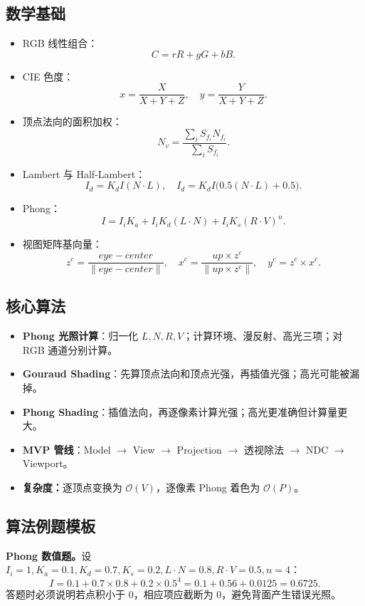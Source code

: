 \documentclass[UTF8,zihao=-4,scheme=chinese,fontset=fandol]{ctexart}
\newcommand{\key}[1]{\textbf{#1}}
\newcommand{\complexity}[1]{\textbf{复杂度：}#1}
\begin{document}
\subsection{数学基础}
\begin{itemize}
  \item RGB 线性组合：
  \[
  C=rR+gG+bB.
  \]
  \item CIE 色度：
  \[
  x=\frac{X}{X+Y+Z},\quad y=\frac{Y}{X+Y+Z}.
  \]
  \item 顶点法向的面积加权：
  \[
  N_v=\frac{\sum_i S_{f_i}N_{f_i}}{\sum_iS_{f_i}}.
  \]
  \item Lambert 与 Half-Lambert：
  \[
  I_d=K_dI(N\cdot L),\quad I_d=K_dI\bigl(0.5(N\cdot L)+0.5\bigr).
  \]
  \item Phong：
  \[
  I=I_iK_a+I_iK_d(L\cdot N)+I_iK_s(R\cdot V)^n.
  \]
  \item 视图矩阵基向量：
  \[
  z^c=\frac{eye-center}{\|eye-center\|},\quad
  x^c=\frac{up\times z^c}{\|up\times z^c\|},\quad
  y^c=z^c\times x^c.
  \]
\end{itemize}

\subsection{核心算法}
\begin{itemize}
  \item \key{Phong 光照计算}：归一化 $L,N,R,V$；计算环境、漫反射、高光三项；对 RGB 通道分别计算。
  \item \key{Gouraud Shading}：先算顶点法向和顶点光强，再插值光强；高光可能被漏掉。
  \item \key{Phong Shading}：插值法向，再逐像素计算光强；高光更准确但计算量更大。
  \item \key{MVP 管线}：Model $\rightarrow$ View $\rightarrow$ Projection $\rightarrow$ 透视除法 $\rightarrow$ NDC $\rightarrow$ Viewport。
  \item \complexity{逐顶点变换为 $\mathcal O(V)$，逐像素 Phong 着色为 $\mathcal O(P)$。}
\end{itemize}

\subsection{算法例题模板}
\textbf{Phong 数值题。}设 $I_i=1,K_a=0.1,K_d=0.7,K_s=0.2,L\cdot N=0.8,R\cdot V=0.5,n=4$：
\[
I=0.1+0.7\times0.8+0.2\times0.5^4=0.1+0.56+0.0125=0.6725.
\]
答题时必须说明若点积小于 $0$，相应项应截断为 $0$，避免背面产生错误光照。
\end{document}

